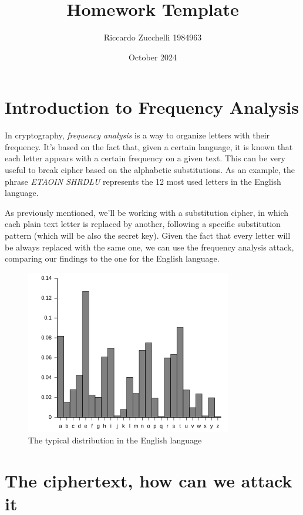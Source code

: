 \documentclass{article}
\title{Homework Template}
\author{Riccardo Zucchelli 1984963}
\date{October 2024}
\begin{document}
\maketitle

\section{Introduction to Frequency Analysis}
In cryptography, \emph{frequency analysis} is a way to organize letters with their frequency. It's based on the fact that, given a certain language, it is known that each letter appears with a certain frequency on a given text. This can be very useful to break cipher based on the alphabetic substitutions. As an example, the phrase \emph{ETAOIN SHRDLU} represents the 12 most used letters in the English language.

As previously mentioned, we'll be working with a substitution cipher, in which each plain text letter is replaced by another, following a specific substitution pattern (which will be also the secret key). Given the fact that every letter will be always replaced with the same one, we can use the frequency analysis attack, comparing our findings to the one for the English language.

\begin{figure}[h]
    \centering
    \includegraphics[width=0.8\linewidth]{image.png}
    \caption{The typical distribution in the English language}
    \label{fig:english}
\end{figure}

\section{The ciphertext, how can we attack it}
\end{document}
